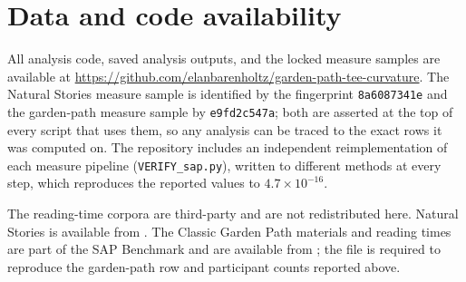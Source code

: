 \documentclass[12pt]{article}
\newcommand{\new}[1]{#1}   %
\begin{document}
\new{\section*{Data and code availability}

All analysis code, saved analysis outputs, and the locked measure samples are
available at \url{https://github.com/elanbarenholtz/garden-path-tee-curvature}.
The Natural Stories measure sample is identified by the fingerprint
\texttt{8a6087341e} and the garden-path measure sample by \texttt{e9fd2c547a};
both are asserted at the top of every script that uses them, so any analysis can
be traced to the exact rows it was computed on. The repository includes an
independent reimplementation of each measure pipeline
(\texttt{VERIFY\_sap.py}), written to different methods at every step, which
reproduces the reported values to $4.7 \times 10^{-16}$.

The reading-time corpora are third-party and are not redistributed here.
Natural Stories is available from \citet{futrell2018}. The Classic Garden Path
materials and reading times are part of the SAP Benchmark and are available from
\citet{huang2024}; the file is required to reproduce the garden-path row and
participant counts reported above.}



\end{document}
